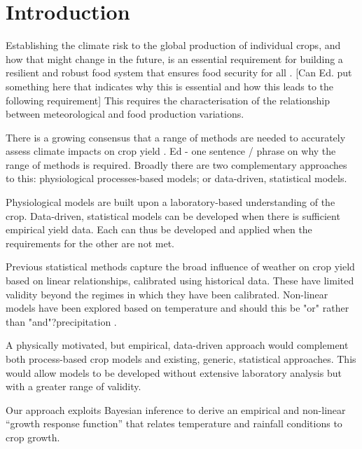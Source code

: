 \documentclass[12pt]{iopart}
\newcommand{\remove}[1]{}
\newcommand{\add}[1]{#1}
\begin{document}
\section{Introduction}

Establishing the climate risk to the global production of individual crops, and how that might change in the future, is an essential requirement for building a resilient and robust food system that ensures food security for all \citep[][]{fao:2002}.
{\color{red} [Can Ed. put something here that indicates why this is essential and how this leads to the following requirement]}
This requires the characterisation of the relationship between meteorological and food production variations. 

There is a growing consensus that a range of methods are needed to accurately assess climate impacts on crop yield \citep[e.g.][]{lobell:2017, tigchelaar:2018, snyder:2018}. {\color{red} Ed - one sentence / phrase on why the range of methods is required.} Broadly there are two complementary approaches to this:  physiological processes-based models; or data-driven, statistical models.

Physiological models are built upon a laboratory-based understanding of the crop. Data-driven, statistical models can be developed when there is sufficient empirical yield data.  Each can thus be developed and applied when the requirements for the other are not met.

Previous statistical methods \citep[e.g.][]{schlenker:2009, lobell:2010, welch:2010} capture the broad influence of weather on crop yield based on linear relationships, calibrated using historical data. These have limited validity beyond the regimes in which they have been calibrated. Non-linear models have been explored based on temperature \citep[e.g.][]{cutforth:1990, yin:1995, wang:1998, yan:1999, streck:2007, zhou:2018} and {\color{red} should this be "or" rather than "and"?}precipitation  \citep[e.g.][]{cakir:2004, ge:2012, lobell:2013, carter:2016, song:2019}.

A physically motivated, but empirical, data-driven approach would complement both process-based crop models and existing, generic, statistical approaches. This would allow models to be developed without extensive laboratory analysis but with a greater range of validity.

Our approach exploits Bayesian inference to derive an empirical \add{and non-linear} ``growth response function'' that \remove{maps}\add{relates} temperature and rainfall conditions to crop growth.
\end{document}
